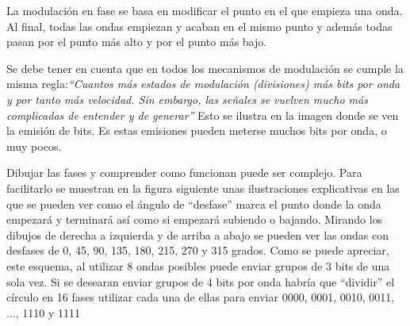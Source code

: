 \documentclass[a4paper,english]{article}
\begin{document}
La modulación en fase se basa en modificar el punto en el que empieza una onda. Al final, todas las ondas empiezan y acaban en el mismo punto y además todas pasan por el punto más alto y por el punto más bajo.

Se debe tener en cuenta que en todos los mecanismos de modulación se cumple la misma regla:\emph{``Cuantos más estados de modulación (divisiones) más bits por onda y por tanto más velocidad. Sin embargo, las señales se vuelven mucho más complicadas de entender y de generar''} Esto se ilustra en la imagen donde se ven la emisión de bits. Es estas emisiones pueden meterse muchos bits por onda, o muy pocos.

\noindent{}

Dibujar las fases y comprender como funcionan puede ser complejo. Para facilitarlo se muestran en la figura siguiente unas ilustraciones explicativas en las que se pueden ver como el ángulo de ``desfase'' marca el punto donde la onda empezará y terminará así como si empezará subiendo o bajando. Mirando los dibujos de derecha a izquierda y de arriba a abajo se pueden ver las ondas con desfases de 0, 45, 90, 135, 180, 215, 270 y 315 grados. Como se puede apreciar, este esquema, al utilizar 8 ondas posibles puede enviar grupos de 3 bits de una sola vez. Si se desearan enviar grupos de 4 bits por onda habría que ``dividir'' el círculo en 16 fases utilizar cada una de ellas para enviar 0000, 0001, 0010, 0011, ..., 1110 y 1111

\noindent{}
\end{document}
